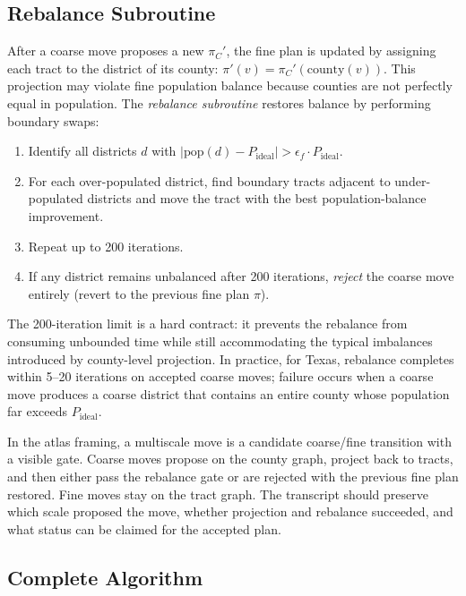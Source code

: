 \subsection{Rebalance Subroutine}

After a coarse move proposes a new $\pi_C'$, the fine plan is updated by
assigning each tract to the district of its county:
$\pi'(v) = \pi_C'(\mathrm{county}(v))$.
This projection may violate fine population balance because counties are not
perfectly equal in population.
The \emph{rebalance subroutine} restores balance by performing boundary swaps:

\begin{enumerate}
  \item Identify all districts $d$ with $|\mathrm{pop}(d) - P_{\mathrm{ideal}}|
        > \epsilon_f \cdot P_{\mathrm{ideal}}$.
  \item For each over-populated district, find boundary tracts adjacent to
        under-populated districts and move the tract with the best
        population-balance improvement.
  \item Repeat up to 200 iterations.
  \item If any district remains unbalanced after 200 iterations, \emph{reject}
        the coarse move entirely (revert to the previous fine plan $\pi$).
\end{enumerate}

The 200-iteration limit is a hard contract: it prevents the rebalance from
consuming unbounded time while still accommodating the typical imbalances
introduced by county-level projection.
In practice, for Texas, rebalance completes within 5--20 iterations on
accepted coarse moves; failure occurs when a coarse move produces a coarse
district that contains an entire county whose population far exceeds
$P_{\mathrm{ideal}}$.

In the atlas framing, a multiscale move is a candidate coarse/fine transition
with a visible gate.
Coarse moves propose on the county graph, project back to tracts, and then
either pass the rebalance gate or are rejected with the previous fine plan
restored.
Fine moves stay on the tract graph.
The transcript should preserve which scale proposed the move, whether
projection and rebalance succeeded, and what status can be claimed for the
accepted plan.

\subsection{Complete Algorithm}


